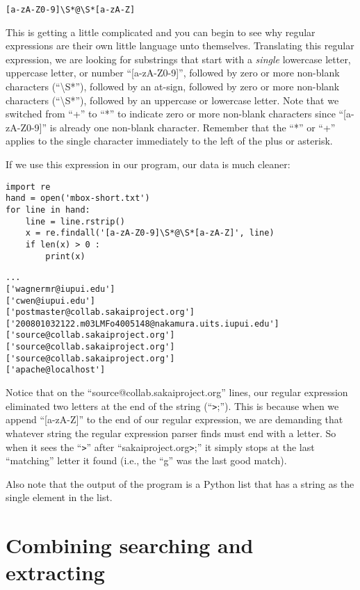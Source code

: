 \beforeverb
\begin{verbatim}
[a-zA-Z0-9]\S*@\S*[a-zA-Z]
\end{verbatim}
\afterverb
%
This is getting a little complicated and you can begin to see why regular expressions are their own
little language unto themselves.  Translating this regular expression, we are looking for substrings
that start with a {\em single} lowercase letter, uppercase letter, or number ``[a-zA-Z0-9]'', followed
by zero or more non-blank characters (``{\textbackslash}S*''), followed by an at-sign, followed by zero
or more non-blank characters (``{\textbackslash}S*''), followed by an uppercase or lowercase letter.
Note that we switched from ``+'' to ``*'' to indicate zero or more non-blank characters since ``[a-zA-Z0-9]''
is already one non-blank character.   Remember that the ``*'' or ``+'' applies to the single character
immediately to the left of the plus or asterisk.

If we use this expression in our program, our data is much cleaner:

\beforeverb
\begin{verbatim}
import re
hand = open('mbox-short.txt')
for line in hand:
    line = line.rstrip()
    x = re.findall('[a-zA-Z0-9]\S*@\S*[a-zA-Z]', line)
    if len(x) > 0 :
        print(x)
\end{verbatim}
\afterverb
%

\beforeverb
\begin{verbatim}
...
['wagnermr@iupui.edu']
['cwen@iupui.edu']
['postmaster@collab.sakaiproject.org']
['200801032122.m03LMFo4005148@nakamura.uits.iupui.edu']
['source@collab.sakaiproject.org']
['source@collab.sakaiproject.org']
['source@collab.sakaiproject.org']
['apache@localhost']
\end{verbatim}
\afterverb
%
Notice that on the ``source@collab.sakaiproject.org'' lines, our regular expression
eliminated two letters at the end of the string (``\verb">";'').  This is because when we
append ``[a-zA-Z]'' to the end of our regular expression, we are demanding that whatever
string the regular expression parser finds must end with a letter.   So when it sees the
``\verb">"'' after ``sakaiproject.org\verb">";'' it simply stops at the last ``matching''
letter it found (i.e., the ``g'' was the last good match).

Also note that the output of the program is a Python list that has a string as the single
element in the list.

\section{Combining searching and extracting}

